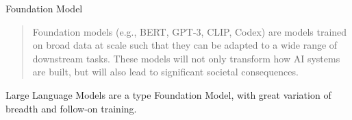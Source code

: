 \documentclass[aspectratio=169]{beamer}
\newcommand{\purplerect}[1]{\begin{tikzpicture}
\node[draw,bingpurple,fill=bingpurple, shape=rectangle, rounded corners=12pt, align=right, text width=3.5cm, inner sep=2mm, blur shadow={shadow blur steps=5}]{\textcolor{white}{#1}}; \end{tikzpicture}}
\newcommand{\whiterect}[1]{\begin{tikzpicture} \node[draw,white,fill=white, shape=rectangle, rounded corners=12pt, align=left, text width=3.5cm, inner sep=2mm, blur shadow={shadow blur steps=5}]{\textcolor{black}{#1}};\end{tikzpicture} }
\newcommand{\setbackground}[2]{
  \setbeamertemplate{background}{
    \begin{tikzpicture}[remember picture,overlay]
      \node[anchor=north west,inner sep=0pt] at ([xshift=0.5cm,yshift=1cm]current page.north west) {\texttt{[image: \#1]}};
      \fill[mask,opacity=#2] (current page.south west) rectangle (current page.north east); %
    \end{tikzpicture}
  }
}
\newcommand{\sectiontemplate}[5]{
  \setbackground{#1}{#2} %
  \begin{frame}[plain]
    \begin{minipage}[t][.9\textheight][t]{.7\textwidth}
      \vspace*{.2\textheight}
      \raggedright
      \begin{snugshade}
      {\LARGE #3}
      \end{snugshade}
    \end{minipage}
    \ifblank{#4}{%
    }{ %
    \hspace{.01\textwidth}    
    \makebox[0pt][l]{\noindent\begin{minipage}[t][.9\textheight][t]{.3\textwidth}
      \raggedleft
       \vspace*{1mm}
      {\tiny #4\\[1em] %
      \vfill
      \colorbox{white}{\qrcode[height=0.5in]{#5}}\\%
      \colorbox{white}{\url{#5}}} %
    \end{minipage}}}
    
  \end{frame}
}
\begin{document}
\begin{frame}{Foundation Model}

\begin{quote}
    Foundation models (e.g., BERT, GPT-3, CLIP, Codex) are models trained on broad data at scale such that they can be adapted to a wide range of downstream tasks. These models will not only transform how AI systems are built, but will also lead to significant societal consequences. \parencite{Etchemendy2022-ak}
\end{quote} 

Large Language Models are a type Foundation Model, with great variation of breadth and follow-on training.

\end{frame}




\end{document}
